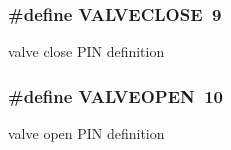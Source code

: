 \subsubsection[{\texorpdfstring{V\+A\+L\+V\+E\+C\+L\+O\+SE}{VALVECLOSE}}]{\setlength{\rightskip}{0pt plus 5cm}\#define V\+A\+L\+V\+E\+C\+L\+O\+SE~9}\hypertarget{group__const_ga62c161c7c128e6b536eb24b11d79ee1a}{}\label{group__const_ga62c161c7c128e6b536eb24b11d79ee1a}


valve close P\+IN definition 

\subsubsection[{\texorpdfstring{V\+A\+L\+V\+E\+O\+P\+EN}{VALVEOPEN}}]{\setlength{\rightskip}{0pt plus 5cm}\#define V\+A\+L\+V\+E\+O\+P\+EN~10}\hypertarget{group__const_ga01d9e55721bcb62fc43ce6590381e7a1}{}\label{group__const_ga01d9e55721bcb62fc43ce6590381e7a1}


valve open P\+IN definition 

